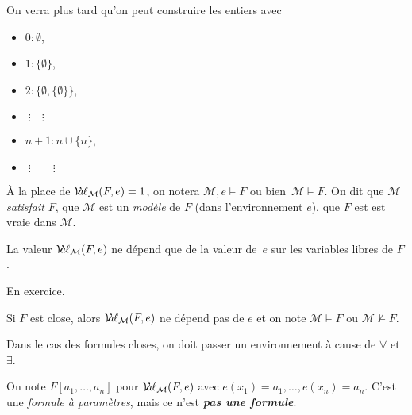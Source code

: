 \documentclass[./main]{subfiles}
\begin{document}
  \begin{rmk}
    On verra plus tard qu'on peut construire les entiers avec 
    \begin{itemize}
      \item $0 : \emptyset$,
      \item $1 : \{\emptyset\}$,
      \item $2 : \{\emptyset, \{\emptyset\}\}$,
      \item $\;\vdots \quad \vdots$
      \item  $n + 1 : n \cup \{n\}$,
      \item $\;\vdots \qquad \vdots$
    \end{itemize}
  \end{rmk}

  \begin{nota}
    À la place de $\mathcal{V}\hspace{-3.5pt}a\hspace{-0.5pt}\ell_{\mathcal{M}}(F, e) = 1$, on notera $\mathcal{M}, e \models F$ ou bien~$\mathcal{M} \models F$.
    On dit que $\mathcal{M}$ \textit{satisfait} $F$, que $\mathcal{M}$ est un \textit{modèle} de $F$ (dans l'environnement $e$), que $F$ est est vraie dans $\mathcal{M}$.
  \end{nota}

  \begin{lem}
    La valeur $\mathcal{V}\hspace{-3.5pt}a\hspace{-0.5pt}\ell_{\mathcal{M}}(F, e)$ ne dépend que de la valeur de~$e$ sur les variables libres de $F$.
  \end{lem}
  \begin{prv}
    En exercice.
  \end{prv}

  \begin{crlr}
    Si $F$ est close, alors $\mathcal{V}\hspace{-3.5pt}a\hspace{-0.5pt}\ell_{\mathcal{M}}(F, e)$ ne dépend pas de $e$ et on note $\mathcal{M} \models F$ ou $\mathcal{M} \not\models F$.
  \end{crlr}

  \begin{rmk}
    Dans le cas des formules closes, on doit passer un environnement à cause de $\forall $ et $\exists $.
  \end{rmk}

  \begin{nota}
    On note $F[a_1, \ldots, a_n]$ pour $\mathcal{V}\hspace{-3.5pt}a\hspace{-0.5pt}\ell_{\mathcal{M}}(F, e)$ avec $e(x_1) = a_1, \ldots, e(x_n) = a_n$.
    C'est une \textit{formule à paramètres}, mais ce n'est \textit{\textbf{pas une formule}}.
  \end{nota}
\end{document}
